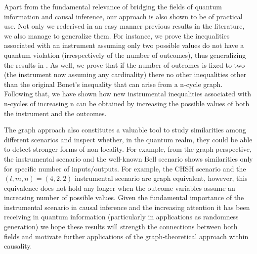 \documentclass[letterpaper]{article}
\begin{document}
Apart from the fundamental relevance of bridging the fields of quantum
information and causal inference, our approach is also shown to be of practical
use. Not only we rederived in an easy manner previous results in the literature,
we also manage to generalize them. For instance, we prove the inequalities
associated with an instrument assuming only two possible values do not have a
quantum violation (irrespectively of the number of outcomes), thus generalizing
the results in \cite{henson2014}. As well, we prove that if the number of
outcomes is fixed to two (the instrument now assuming any cardinality) there no
other inequalities other than the original Bonet's inequality \cite{bonet2001}
that can arise from a n-cycle graph. Following that, we have shown how new
instrumental inequalities associated with n-cycles of increasing n can be
obtained by increasing the possible values of both the instrument and the
outcomes.

The graph approach also constitutes a valuable tool to study similarities among
different scenarios and inspect whether, in the quantum realm, they could be
able to detect stronger forms of non-locality. For example, from the graph
perspective, the instrumental scenario and the well-known Bell scenario shows
similarities only for specific number of inputs/outputs. For example, the CHSH
scenario \cite{CHSH} and the $(l,m,n)=(4,2,2)$ instrumental scenario are graph
equivalent, however, this equivalence does not hold any longer when the outcome
variables assume an increasing number of possible values. Given the fundamental
importance of the instrumental scenario in causal inference and the increasing
attention it has been receiving in quantum information (particularly in
applications as randomness generation) we hope these results will strength the
connections between both fields and motivate further applications of the
graph-theoretical approach within causality.


\end{document}
